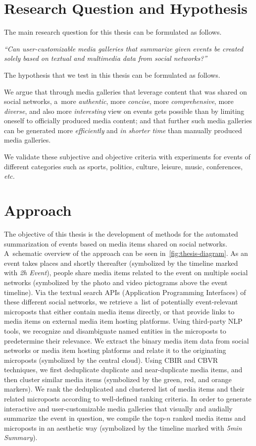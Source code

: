 \section{Research Question and Hypothesis}

The main research question for this thesis
can be formulated as follows.
 
\textit{``Can user-customizable
media galleries that summarize given events be
created solely based on textual and multimedia data
from social networks?''}

\noindent The hypothesis that we test in this thesis
can be formulated as follows.

We argue that through media galleries that leverage content
that was shared on social networks,
a~more \emph{authentic}, more \emph{concise},
more \emph{comprehensive}, more \emph{diverse},
and also more \emph{interesting}
view on events gets possible than by limiting oneself
to officially produced media content;
and that further such media galleries can be generated
more \emph{efficiently} and \emph{in shorter time}
than manually produced media galleries.

We validate these subjective and objective
criteria with experiments for events of different categories
such as sports, politics, culture, leisure,
music, conferences, \emph{etc.}

\section{Approach}

The objective of this thesis is the development
of methods for the automated summarization of events
based on media items shared on social networks.
A~schematic overview of the approach can be seen
in~\autoref{fig:thesis-diagram}.
As an event takes places and shortly thereafter
(symbolized by the timeline marked with \emph{2h Event}),
people share media items related to the event
on multiple social networks
(symbolized by the photo and video pictograms
above the event timeline).
Via the textual search APIs (Application Programming Interfaces)
of these different social networks,
we retrieve a~list of potentially event-relevant
microposts that either contain media items directly,
or that provide links to media items
on external media item hosting platforms.
Using third-party NLP tools,
we recognize and disambiguate named entities
in the microposts to predetermine their relevance.
We extract the binary media item data
from social networks or media item hosting platforms
and relate it to the originating microposts
(symbolized by the central cloud).
Using CBIR and CBVR techniques, we first deduplicate
duplicate and near-duplicate media items,
and then cluster similar media items
(symbolized by the green, red, and orange markers).
We rank the deduplicated and clustered list
of media items and their related microposts
according to well-defined ranking criteria.
In order to generate interactive and user-customizable
media galleries that visually and audially summarize the
event in question, we compile the top-$n$ ranked
media items and microposts in an aesthetic way
(symbolized by the timeline marked with \emph{5min Summary}).

